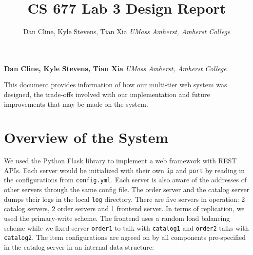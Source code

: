 \documentclass[11pt,]{article}
\title{CS 677 Lab 3 Design Report  }
\author{\Large Dan Cline, Kyle Stevens, Tian Xia\vspace{0.05in} \newline\normalsize\emph{UMass Amherst, Amherst College}  }
\date{}
\newcommand*{\authorfont}{\fontfamily{phv}\selectfont}
\renewenvironment{abstract}
 {{%
    \setlength{\leftmargin}{0mm}
    \setlength{\rightmargin}{\leftmargin}%
  }%
  \relax}
 {\endlist}
\begin{document}
	
%

{%
\setlength{\parindent}{0pt}
\thispagestyle{plain}
{\fontsize{18}{20}\selectfont\raggedright 
\maketitle  %

}

{
   \vskip 13.5pt\relax \normalsize\fontsize{11}{12} 
\textbf{\authorfont Dan Cline, Kyle Stevens, Tian Xia} \hskip 15pt \emph{\small UMass Amherst, Amherst College}   

}

}








\begin{abstract}

    \hbox{\vrule height .2pt width 39.14pc}

    \vskip 8.5pt %

\noindent This document provides information of how our multi-tier web system was
designed, the trade-offs involved with our implementation and future
improvements that may be made on the system.


    \hbox{\vrule height .2pt width 39.14pc}


\end{abstract}


\vskip -8.5pt



\noindent  

\hypertarget{overview-of-the-system}{%
\section{Overview of the System}\label{overview-of-the-system}}

We used the Python Flask library to implement a web framework with REST
APIs. Each server would be initialized with their own \texttt{ip} and
\texttt{port} by reading in the configurations from \texttt{config.yml}.
Each server is also aware of the addresses of other servers through the
same config file. The order server and the catalog server dumps their
logs in the local \texttt{log} directory. There are five servers in
operation: 2 catalog servers, 2 order servers and 1 frontend server. In
terms of replication, we used the primary-write scheme. The frontend
uses a random load balancing scheme while we fixed server
\texttt{order1} to talk with \texttt{catalog1} and \texttt{order2} talks
with \texttt{catalog2}. The item configurations are agreed on by all
components pre-specified in the catalog server in an internal data
structure:
\end{document}
